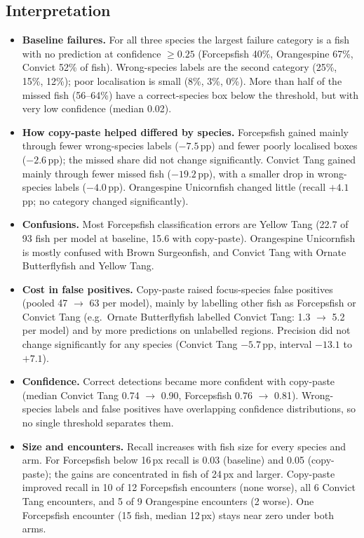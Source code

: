 \documentclass[11pt,a4paper]{article}
\begin{document}
\subsection*{Interpretation}
\begin{itemize}
\item \textbf{Baseline failures.} For all three species the largest failure category is a fish with no prediction at confidence
$\geq0.25$ (Forcepsfish 40\%, Orangespine 67\%, Convict 52\% of fish). Wrong-species labels are the second category (25\%, 15\%,
12\%); poor localisation is small (8\%, 3\%, 0\%). More than half of the missed fish (56--64\%) have a correct-species box below the threshold, but
with very low confidence (median 0.02).
\item \textbf{How copy-paste helped differed by species.} Forcepsfish gained mainly through fewer wrong-species labels ($-7.5$\,pp)
and fewer poorly localised boxes ($-2.6$\,pp); the missed share did not change significantly. Convict Tang gained mainly through fewer
missed fish ($-19.2$\,pp), with a smaller drop in wrong-species labels ($-4.0$\,pp). Orangespine Unicornfish changed little
(recall $+4.1$\,pp; no category changed significantly).
\item \textbf{Confusions.} Most Forcepsfish classification errors are Yellow Tang (22.7 of 93 fish per model at baseline, 15.6 with
copy-paste). Orangespine Unicornfish is mostly confused with Brown Surgeonfish, and Convict Tang with Ornate Butterflyfish and
Yellow Tang.
\item \textbf{Cost in false positives.} Copy-paste raised focus-species false positives (pooled 47 $\rightarrow$ 63 per model), mainly
by labelling other fish as Forcepsfish or Convict Tang (e.g.\ Ornate Butterflyfish labelled Convict Tang: 1.3 $\rightarrow$ 5.2 per
model) and by more predictions on unlabelled regions. Precision did not change significantly for any species (Convict Tang
$-5.7$\,pp, interval $-13.1$ to $+7.1$).
\item \textbf{Confidence.} Correct detections became more confident with copy-paste (median Convict Tang 0.74 $\rightarrow$ 0.90,
Forcepsfish 0.76 $\rightarrow$ 0.81). Wrong-species labels and false positives have overlapping confidence distributions, so no single
threshold separates them.
\item \textbf{Size and encounters.} Recall increases with fish size for every species and arm. For Forcepsfish below 16\,px recall is
0.03 (baseline) and 0.05 (copy-paste); the gains are concentrated in fish of 24\,px and larger. Copy-paste improved recall in 10 of
12 Forcepsfish encounters (none worse), all 6 Convict Tang encounters, and 5 of 9 Orangespine encounters (2 worse). One
Forcepsfish encounter (15 fish, median 12\,px) stays near zero under both arms.
\end{itemize}
\end{document}
